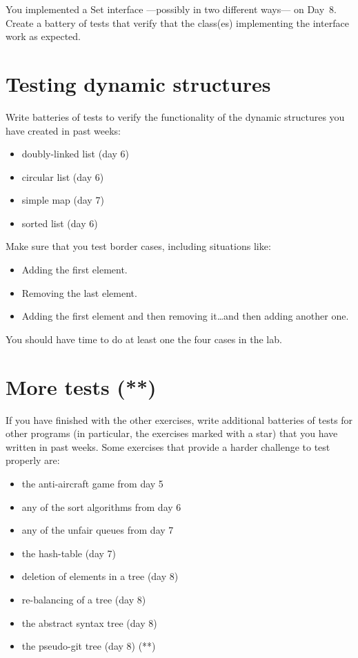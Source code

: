 \documentclass{article}
\begin{document}
You implemented a Set interface ---possibly in two different ways--- on
Day~8. Create a battery of tests that verify that the class(es)
implementing the interface work as expected. 


\section{Testing dynamic structures}
\label{sec:testing-maps}

Write batteries of tests to verify the functionality of the dynamic
structures you have created in past weeks: 

\begin{itemize}
\item doubly-linked list (day 6)
\item circular list (day 6)
\item simple map (day 7)
\item sorted list (day 6)
\end{itemize}

Make sure that you test border cases, including situations like: 

\begin{itemize}
\item Adding the first element.
\item Removing the last element.
\item Adding the first element and then removing it\ldots and then
  adding another one.
\end{itemize}

You should have time to do at least one the four cases in the lab.

\section{More tests (**)}
\label{sec:more-tests-}

If you have finished with the other exercises, write additional
batteries of tests for other programs (in particular, the exercises
marked with a star)  that you have written in past
weeks. Some exercises that provide a harder challenge to test properly
are: 

\begin{itemize}
\item the anti-aircraft game from day 5
\item any of the sort algorithms from day 6
\item any of the unfair queues from day 7
\item the hash-table (day 7)
\item deletion of elements in a tree (day 8)
\item re-balancing of a tree (day 8)
\item the abstract syntax tree (day 8)
\item the pseudo-git tree (day 8) (**)
\end{itemize}
\end{document}
